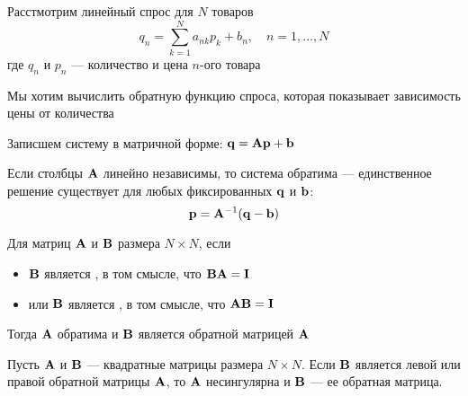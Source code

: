 \begin{frame}
    
    \vspace{2em}
    \Eg
    Расстмотрим линейный спрос для $N$ товаров
    \begin{equation*}
        q_n = \sum_{k=1}^N a_{nk} p_k + b_n,
        \quad n = 1, \ldots, N
    \end{equation*}
    где $q_n$ и $p_n$ --- количество и цена $n$-ого товара
    
    \vspace{.7em}
    Мы хотим вычислить обратную функцию спроса, 
    которая показывает зависимость цены от количества
    
    \vspace{.7em}
    Записшем систему в матричной форме: ${\mathbf q} = \mathbf A {\mathbf p} + {\mathbf b}$
    
    Если столбцы $\mathbf A$ линейно независимы, то 
    система обратима --- единственное решение существует для
    любых фиксированных ${\mathbf q}$ и ${\mathbf b}$:
    \[{\mathbf p} = \mathbf A^{-1} ({\mathbf q} - {\mathbf b})\]
    
\end{frame}

\begin{frame}

    \vspace{.7em}    
    Для матриц $\mathbf A$ и $\mathbf B$ размера $N\times N$, если
    
    \begin{itemize}
        \item $\mathbf B$ является
        , в том смысле, что $\mathbf B \mathbf A = \mathbf I$ 
        \item  или $\mathbf B$ является , в том смысле, 
        что $\mathbf A \mathbf B = \mathbf I$ 
    \end{itemize}

    \vspace{.7em}    
    Тогда $\mathbf A$ обратима и $\mathbf B$ является обратной матрицей $\mathbf A$
    
    \vspace{.7em}
    \Fact{\eqref{ET-fa:lrinv}}
    Пусть $\mathbf A$ и $\mathbf B$ --- квадратные матрицы размера $N \times N$.
    Если $\mathbf B$ является левой или правой обратной матрицы $\mathbf A$,
    то $\mathbf A$ несингулярна и $\mathbf B$ --- ее обратная матрица.
 

\end{frame}

